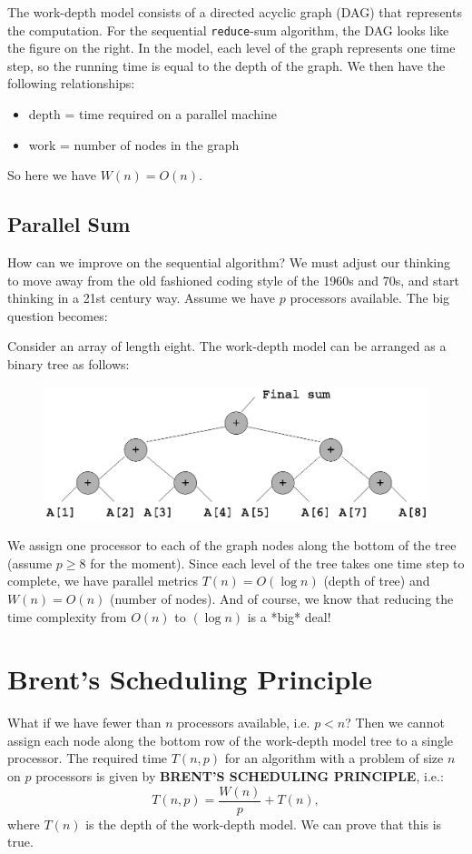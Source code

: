 \documentclass[twoside]{article}
\begin{document}
The work-depth model consists of a directed acyclic graph (DAG) that represents the computation. For the sequential \texttt{reduce}-sum algorithm, the DAG looks like the figure on the right. In the model, each level of the graph represents one time step, so the running time is equal to the depth of the graph. We then have the following relationships:
\begin{itemize}
	\item depth = time required on a parallel machine
	\item work = number of nodes in the graph
\end{itemize}
So here we have $W(n) = O(n)$.

\subsection{Parallel Sum} \label{sec:parSum}
How can we improve on the sequential algorithm? We must adjust our thinking to move away from the old fashioned coding style of the 1960s and 70s, and start thinking in a 21st century way. Assume we have $p$ processors available. The big question becomes:
\begin{center}
\end{center}
Consider an array of length eight. The work-depth model can be arranged as a binary tree as follows:
\begin{figure}[h]
\center
\includegraphics[scale=0.75]{img/wd_model_2} 
\end{figure}

We assign one processor to each of the graph nodes along the bottom of the tree (assume $p\geq 8$ for the moment). Since each level of the tree takes one time step to complete, we have parallel metrics $T(n) = O(\log n)$ (depth of tree) and $W(n) = O(n)$ (number of nodes). And of course, we know that reducing the time complexity from $O(n)$ to $(\log n)$ is a *big* deal!

\section{Brent's Scheduling Principle}
What if we have fewer than $n$ processors available, i.e. $p<n$? Then we cannot assign each node along the bottom row of the work-depth model tree to a single processor. The required time $T(n,p)$ for an algorithm with a problem of size $n$ on $p$ processors is given by \textbf{BRENT'S SCHEDULING PRINCIPLE}, i.e.:
\[
T(n,p) = \frac{W(n)}{p} + T(n),
\]
where $T(n)$ is the depth of the work-depth model. We can prove that this is true.
\end{document}
